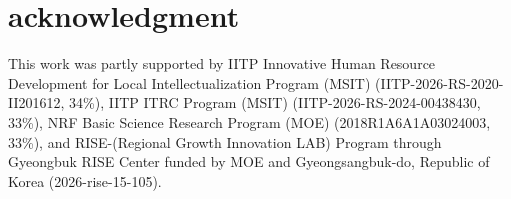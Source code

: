 \documentclass[conference]{IEEEtran}
\begin{document}
\section *{\textbf{acknowledgment}}
\vspace{-0.2cm}
This work was partly supported by IITP Innovative Human Resource Development for Local Intellectualization Program (MSIT) (IITP-2026-RS-2020-II201612, 34\%), IITP ITRC Program (MSIT) (IITP-2026-RS-2024-00438430, 33\%), NRF Basic Science Research Program (MOE) (2018R1A6A1A03024003, 33\%), and RISE-(Regional Growth Innovation LAB) Program through Gyeongbuk RISE Center funded by MOE and Gyeongsangbuk-do, Republic of Korea (2026-rise-15-105).

\balance




\end{document}
